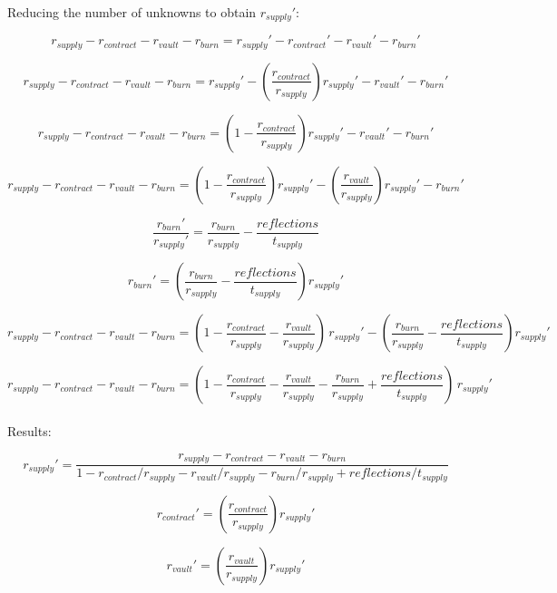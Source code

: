 \documentclass[letterpaper,11pt]{article}
\begin{document}
Reducing the number of unknowns to obtain $r_{supply}'$:

$$r_{supply} - r_{contract} - r_{vault} - r_{burn} = r_{supply}' - r_{contract}' - r_{vault}' - r_{burn}'$$


$$r_{supply} - r_{contract} - r_{vault} - r_{burn} = r_{supply}' - \left(\frac{r_{contract}}{r_{supply}}\right)r_{supply}' - r_{vault}' - r_{burn}'$$


$$r_{supply} - r_{contract} - r_{vault} - r_{burn} = \left(1-\frac{r_{contract}}{r_{supply}}\right)r_{supply}' - r_{vault}' - r_{burn}' $$


$$r_{supply} - r_{contract} - r_{vault} - r_{burn} = \left(1-\frac{r_{contract}}{r_{supply}}\right)r_{supply}' - \left(\frac{r_{vault}}{r_{supply}}\right)r_{supply}' - 
r_{burn}' $$


$$\frac{r_{burn}'}{r_{supply}'} = \frac{r_{burn}}{r_{supply}} - \frac{reflections}{t_{supply}}$$ 


$$r_{burn}' = \left(\frac{r_{burn}}{r_{supply}} - \frac{reflections}{t_{supply}}\right)r_{supply}'$$

$$r_{supply} - r_{contract} - r_{vault} - r_{burn} = (1 - \frac{r_{contract}}{r_{supply}} -\frac{r_{vault}}{r_{supply}})\,r_{supply}' - \left(\frac{r_{burn}}{r_{supply}} - \frac{reflections}{t_{supply}}\right)r_{supply}'$$

$$r_{supply} - r_{contract} - r_{vault} - r_{burn} = (1 - \frac{r_{contract}}{r_{supply}} - \frac{r_{vault}}{r_{supply}} - \frac{r_{burn}}{r_{supply}} + \frac{reflections}{t_{supply}})\,r_{supply}'$$\\


\noindent Results:

$$r_{supply}'=\frac{r_{supply} - r_{contract} - r_{vault} - r_{burn}}{1 - r_{contract}/r_{supply} - r_{vault}/r_{supply} - r_{burn}/r_{supply} + reflections/t_{supply}}$$

$$r_{contract}' = \left(\frac{r_{contract}}{r_{supply}}\right)r_{supply}' $$

$$r_{vault}'= \left(\frac{r_{vault}}{r_{supply}}\right)r_{supply}'$$
\end{document}
